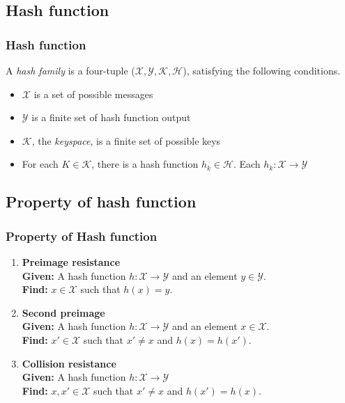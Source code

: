 \documentclass{beamer}
\begin{document}
\subsection{Hash function}
\begin{frame}
  \frametitle{Hash function}
  A \emph{hash family} is a four-tuple ($\mathcal{X}, \mathcal{Y}, \mathcal{K}, \mathcal{H}$),
  satisfying the following conditions.\footnotemark
  \begin{itemize}
    \item $\mathcal{X}$ is a set of possible messages
    \item $\mathcal{Y}$ is a finite set of hash function output
    \item $\mathcal{K}$, the \emph{keyspace}, is a finite set of possible keys
    \item For each $K \in \mathcal{K}$, there is a hash function $h_{k} \in \mathcal{H}$. Each 
      $h_{k}: \mathcal{X} \to \mathcal{Y}$ 
  \end{itemize}
\end{frame}

\subsection{Property of hash function}
\begin{frame}
  \frametitle{Property of Hash function\footnotemark}
  \begin{enumerate}
  \item {\bf Preimage resistance} \\
  {\bf Given:} A hash function $h : \mathcal{X} \to \mathcal{Y}$ and an element $y \in \mathcal{Y}$. \\
  {\bf Find:} $x \in \mathcal{X}$ such that $h(x) = y$.
  \item {\bf Second preimage} \\
  {\bf Given:} A hash function $h : \mathcal{X} \to \mathcal{Y}$ and an element $x \in \mathcal{X}$. \\
  {\bf Find:} $x' \in \mathcal{X}$ such that $x' \neq x$ and $h(x) = h(x')$.
  \item {\bf Collision resistance} \\
  {\bf Given:} A hash function $h : \mathcal{X} \to \mathcal{Y}$ \\
  {\bf Find:} $x, x' \in \mathcal{X}$ such that $x' \neq x$ and $h(x') = h(x)$. 
  \end{enumerate}
\end{frame}
\end{document}
